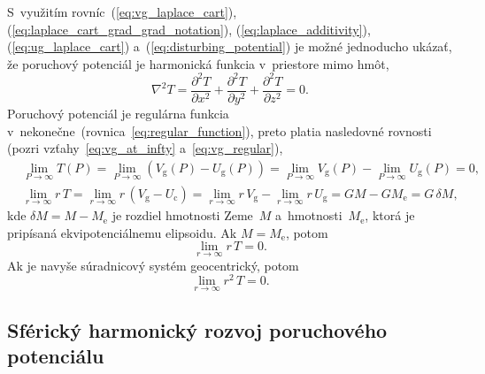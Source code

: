 \documentclass[a4paper, 12pt]{book}
\newcommand{\gidx}{\mathrm g}
\newcommand{\cidx}{\mathrm c}
\begin{document}
S~využitím rovníc~(\ref{eq:vg_laplace_cart}), 
(\ref{eq:laplace_cart_grad_grad_notation}), (\ref{eq:laplace_additivity}), 
(\ref{eq:ug_laplace_cart}) a~(\ref{eq:disturbing_potential}) je možné 
jednoducho ukázať, že poruchový potenciál je harmonická funkcia v~priestore 
mimo hmôt,
%
\begin{equation}
\label{eq:laplace_xyz_t}
\nabla^2 T = \frac{\partial^2 T}{\partial x^2} + \frac{\partial^2 T}{\partial 
y^2} + \frac{\partial^2 T}{\partial z^2} = 0{.}
\end{equation}
%
Poruchový potenciál je regulárna funkcia 
v~nekonečne~(rovnica~\ref{eq:regular_function}), preto platia nasledovné 
rovnosti (pozri vzťahy~\ref{eq:vg_at_infty} a~\ref{eq:vg_regular}),
%
\begin{align}
\label{eq:t_infty}
&\lim_{P \rightarrow \infty} T(P) = \lim_{P \rightarrow \infty} (V_\gidx(P) 
- U_\gidx(P)) = \lim_{P \rightarrow \infty} V_\gidx(P) - \lim_{P \rightarrow 
\infty} U_\gidx(P) = 0{,}\\
%
\label{eq:t_regular}
&\lim_{r \rightarrow \infty} r \, T = \lim_{r \rightarrow \infty} r \, (V_\gidx 
 - U_\cidx) = \lim_{r \rightarrow \infty} r \, V_\gidx - \lim_{r \rightarrow 
 \infty} r \, U_\gidx = GM - GM_{\mathrm{e}} = G \, \delta M{,}
\end{align}
%
kde $\delta M = M - M_\mathrm{e}$ je rozdiel hmotnosti Zeme~$M$ 
a~hmotnosti~$M_\mathrm{e}$, ktorá je pripísaná ekvipotenciálnemu elipsoidu.  Ak 
$M = M_\mathrm{e}$, potom
%
\begin{equation}
\lim_{r \rightarrow \infty} r \, T = 0{.}
\end{equation}
%
Ak je navyše súradnicový systém geocentrický, potom \parencite{Pick1973}
%
\begin{equation}
\lim_{r \rightarrow \infty} r^2 \, T = 0{.}
\end{equation}


\subsection{Sférický harmonický rozvoj poruchového potenciálu}
\end{document}
